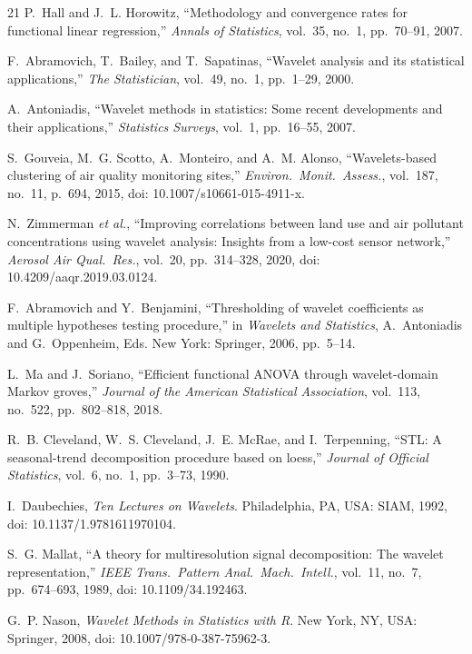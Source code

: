 \documentclass[12pt,letterpaper]{article}
\begin{document}
\begin{thebibliography}{21}
P.~Hall and J.~L. Horowitz,
``Methodology and convergence rates for functional linear regression,''
\textit{Annals of Statistics}, vol.~35, no.~1, pp.~70--91, 2007.

F.~Abramovich, T.~Bailey, and T.~Sapatinas,
``Wavelet analysis and its statistical applications,''
\textit{The Statistician}, vol.~49, no.~1, pp.~1--29, 2000.

A.~Antoniadis,
``Wavelet methods in statistics: Some recent developments and their applications,''
\textit{Statistics Surveys}, vol.~1, pp.~16--55, 2007.

S.~Gouveia, M.~G. Scotto, A.~Monteiro, and A.~M. Alonso,
``Wavelets-based clustering of air quality monitoring sites,''
\textit{Environ.\ Monit.\ Assess.}, vol.~187, no.~11, p.~694, 2015, doi: 10.1007/s10661-015-4911-x.

N.~Zimmerman \textit{et al.},
``Improving correlations between land use and air pollutant concentrations using wavelet analysis: Insights from a low-cost sensor network,''
\textit{Aerosol Air Qual.\ Res.}, vol.~20, pp.~314--328, 2020, doi: 10.4209/aaqr.2019.03.0124.

F.~Abramovich and Y.~Benjamini,
``Thresholding of wavelet coefficients as multiple hypotheses testing procedure,''
in \textit{Wavelets and Statistics}, A.~Antoniadis and G.~Oppenheim, Eds.
New York: Springer, 2006, pp.~5--14.

L.~Ma and J.~Soriano,
``Efficient functional ANOVA through wavelet-domain Markov groves,''
\textit{Journal of the American Statistical Association}, vol.~113, no.~522, pp.~802--818, 2018.

R.~B. Cleveland, W.~S. Cleveland, J.~E. McRae, and I.~Terpenning,
``STL: A seasonal-trend decomposition procedure based on loess,''
\textit{Journal of Official Statistics}, vol.~6, no.~1, pp.~3--73, 1990.

I.~Daubechies,
\textit{Ten Lectures on Wavelets}.
Philadelphia, PA, USA: SIAM, 1992, doi: 10.1137/1.9781611970104.

S.~G. Mallat,
``A theory for multiresolution signal decomposition: The wavelet representation,''
\textit{IEEE Trans.\ Pattern Anal.\ Mach.\ Intell.}, vol.~11, no.~7, pp.~674--693, 1989, doi: 10.1109/34.192463.

G.~P. Nason,
\textit{Wavelet Methods in Statistics with R}.
New York, NY, USA: Springer, 2008, doi: 10.1007/978-0-387-75962-3.

\end{thebibliography}
\end{document}
